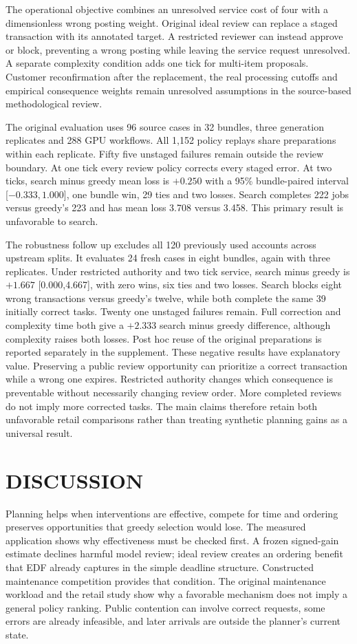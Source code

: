 The operational objective combines an unresolved service cost of four with a dimensionless wrong posting weight. Original ideal review can replace a staged transaction with its annotated target. A restricted reviewer can instead approve or block, preventing a wrong posting while leaving the service request unresolved. A separate complexity condition adds one tick for multi-item proposals. Customer reconfirmation after the replacement, the real processing cutoffs and empirical consequence weights remain unresolved assumptions in the source-based methodological review.

The original evaluation uses 96 source cases in 32 bundles, three generation replicates and 288 GPU workflows. All 1,152 policy replays share preparations within each replicate. Fifty five unstaged failures remain outside the review boundary. At one tick every review policy corrects every staged error. At two ticks, search minus greedy mean loss is $+0.250$ with a 95\% bundle-paired interval [$-0.333,1.000$], one bundle win, 29 ties and two losses. Search completes 222 jobs versus greedy's 223 and has mean loss 3.708 versus 3.458. This primary result is unfavorable to search.

The robustness follow up excludes all 120 previously used accounts across upstream splits. It evaluates 24 fresh cases in eight bundles, again with three replicates. Under restricted authority and two tick service, search minus greedy is $+1.667$ [0.000,4.667], with zero wins, six ties and two losses. Search blocks eight wrong transactions versus greedy's twelve, while both complete the same 39 initially correct tasks. Twenty one unstaged failures remain. Full correction and complexity time both give a $+2.333$ search minus greedy difference, although complexity raises both losses. Post hoc reuse of the original preparations is reported separately in the supplement.
These negative results have explanatory value. Preserving a public review opportunity can prioritize a correct transaction while a wrong one expires. Restricted authority changes which consequence is preventable without necessarily changing review order. More completed reviews do not imply more corrected tasks. The main claims therefore retain both unfavorable retail comparisons rather than treating synthetic planning gains as a universal result.



\section{DISCUSSION}
\noindent Planning helps when interventions are effective, compete for time and ordering preserves opportunities that greedy selection would lose. The measured application shows why effectiveness must be checked first. A frozen signed-gain estimate declines harmful model review; ideal review creates an ordering benefit that EDF already captures in the simple deadline structure. Constructed maintenance competition provides that condition. The original maintenance workload and the retail study show why a favorable mechanism does not imply a general policy ranking. Public contention can involve correct requests, some errors are already infeasible, and later arrivals are outside the planner's current state.

